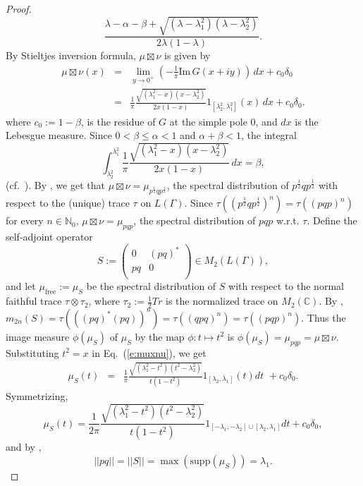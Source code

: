\documentclass{amsart}
\newcommand{\C}{\mathbb C}
\newcommand{\N}{\mathbb N}
\newcommand{\im}{\mathrm{Im }}
\newcommand{\supp}{\mathrm{supp }}
\theoremstyle{definition}
\begin{document}
\begin{proof}
$$\frac{\lambda-\alpha -\beta + \sqrt{(\lambda-\lambda_1^2)(\lambda-\lambda_2^2)}}{2\lambda(1-\lambda)}.
$$
By Stieltjes inversion formula,  $\mu\boxtimes\nu$ is given by
\begin{eqnarray}\label{e:muxnu}
\mu\boxtimes\nu(x)&=&\lim_{y\to 0^+}\left(- \frac1{\pi}\im\, G(x+iy)\right)\,dx+c_0\delta_0\\
\nonumber&=&\frac1{\pi}\frac{\sqrt{(\lambda_1^2-x)(x-\lambda_2^2)}}{2x(1-x)}1_{[\lambda_2^2,\lambda_1^2]}(x)\,dx+c_0\delta_0.
\end{eqnarray}
where $c_0:=1-\beta $, is the residue of $G$ at the simple pole $0$, and $dx$ is the Lebesgue measure.
Since $0< \beta \le \alpha <1$ and $\alpha +\beta <1$, the integral
\begin{equation}\label{e:intm0}
\int_{\lambda_2^2}^{\lambda_1^2}\frac1{\pi}\frac{\sqrt{(\lambda_1^2-x)(x-\lambda_2^2)}}{2x(1-x)}\,dx=\beta ,
\end{equation}
(cf.~\cite[Example 4.3.3]{Inge}).
By \cite[Remarks 3.6.2(iii)]{Voiculescu}, we get that $\mu\boxtimes\nu=\mu_{p^{\frac12}qp^{\frac12}}$, the spectral distribution of $p^{\frac12}qp^{\frac12}$ with respect to the (unique) trace $\tau$ on $L(\Gamma)$. Since $\tau((p^{\frac12}qp^{\frac12})^n)=\tau((pqp)^n)$ for every $n\in\N_0$, $\mu\boxtimes\nu=\mu_{pqp}$, the spectral distribution of $pqp$ w.r.t. $\tau$.
Define the self-adjoint operator 
$$S:=\left(
\begin{array}{cc}
 0 & (pq)^* \\
 pq & 0 \\
\end{array}
\right)\in M_2(L(\Gamma)),
$$
and let $\mu_{\mathrm{free}}:=\mu_S$ be the spectral distribution of $S$ with respect to the normal faithful trace $\tau\otimes\tau_2$, where $\tau_2:=\frac12 Tr$ is the normalized trace on $M_2(\C)$.
By \cite[Eq.~(2.6)]{HaagerupRamirezSolano}, $m_{2n}(S)=\tau(((pq)^*(pq))^{n})=\tau((qpq)^{n})=\tau((pqp)^{n})$.
Thus the image measure $\phi(\mu_S)$ of $\mu_S$ by the map $\phi:t\mapsto t^2$ is $\phi(\mu_{S})=\mu_{pqp}=\mu\boxtimes\nu$.
Substituting $t^2=x$ in Eq.~(\ref{e:muxnu}), we get
\begin{eqnarray*}
\mu_{S}(t)%
&=&\frac1{\pi}\frac{\sqrt{(\lambda_1^2-t^2)(t^2-\lambda_2^2)}}{t(1-t^2)} 1_{[\lambda_2,\lambda_1]}(t) dt \,\,+ c_0\delta_0.
\end{eqnarray*}
Symmetrizing,
$$
\mu_{S}(t)=\frac 1{2\pi}\frac{\sqrt{(\lambda_1^2-t^2)(t^2-\lambda_2^2)}}{t(1-t^2)} 1_{[-\lambda_1,-\lambda_2]\cup[\lambda_2,\lambda_1]} dt+ c_0\delta_0,
$$and by
 \cite[Eq~(2.7)]{HaagerupRamirezSolano}, 
 $$||pq||=||S||=\max(\supp(\mu_S))=\lambda_1.$$  
\end{proof}
\end{document}
